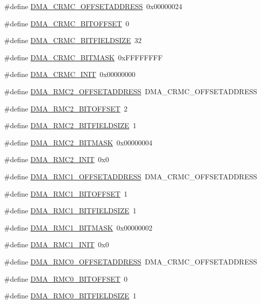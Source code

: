 \begin{DoxyCompactItemize}
\item 
\#define \hyperlink{a00547_ab593331124f5415f59ad68c3ae690b64}{DMA\_\-CRMC\_\-OFFSETADDRESS}~0x00000024
\item 
\#define \hyperlink{a00547_a72ebeac28cdf9162668b8908367c370d}{DMA\_\-CRMC\_\-BITOFFSET}~0
\item 
\#define \hyperlink{a00547_a823f60716f78a2c3a66eb5a139d6d436}{DMA\_\-CRMC\_\-BITFIELDSIZE}~32
\item 
\#define \hyperlink{a00547_a0b33b42fa957d2ff26cc8b7b2988ccfb}{DMA\_\-CRMC\_\-BITMASK}~0xFFFFFFFF
\item 
\#define \hyperlink{a00547_a3251d4d44ab7778d9bffcf0a89156981}{DMA\_\-CRMC\_\-INIT}~0x00000000
\item 
\#define \hyperlink{a00547_a274aa4d9df3d885c6f22ab728c344cc6}{DMA\_\-RMC2\_\-OFFSETADDRESS}~DMA\_\-CRMC\_\-OFFSETADDRESS
\item 
\#define \hyperlink{a00547_a9024fc0ebbf15bf06caf6eed604362ac}{DMA\_\-RMC2\_\-BITOFFSET}~2
\item 
\#define \hyperlink{a00547_a084db9480bac43cebae8198fff82ad17}{DMA\_\-RMC2\_\-BITFIELDSIZE}~1
\item 
\#define \hyperlink{a00547_a7489009b1a8178a381e272ceec884efa}{DMA\_\-RMC2\_\-BITMASK}~0x00000004
\item 
\#define \hyperlink{a00547_af43b6b91df8724bea9bb011a2097680b}{DMA\_\-RMC2\_\-INIT}~0x0
\item 
\#define \hyperlink{a00547_ab33eef90d93c3c0d0038af568d569928}{DMA\_\-RMC1\_\-OFFSETADDRESS}~DMA\_\-CRMC\_\-OFFSETADDRESS
\item 
\#define \hyperlink{a00547_a4c27204c100375906d3c717e1db66986}{DMA\_\-RMC1\_\-BITOFFSET}~1
\item 
\#define \hyperlink{a00547_aca19d261f11d5272f20a429386f1e46f}{DMA\_\-RMC1\_\-BITFIELDSIZE}~1
\item 
\#define \hyperlink{a00547_a06d57ad7f6a2245687d354c61a9762ff}{DMA\_\-RMC1\_\-BITMASK}~0x00000002
\item 
\#define \hyperlink{a00547_aded926e34290e2d81d63d57f791484e2}{DMA\_\-RMC1\_\-INIT}~0x0
\item 
\#define \hyperlink{a00547_adbc08a82326f5ff788b0f0b5ecc549c2}{DMA\_\-RMC0\_\-OFFSETADDRESS}~DMA\_\-CRMC\_\-OFFSETADDRESS
\item 
\#define \hyperlink{a00547_a4d7f484b0f74d9099476be859120c47a}{DMA\_\-RMC0\_\-BITOFFSET}~0
\item 
\#define \hyperlink{a00547_a14a52b9dc893b21683e2758a670e0951}{DMA\_\-RMC0\_\-BITFIELDSIZE}~1

\end{DoxyCompactItemize}

